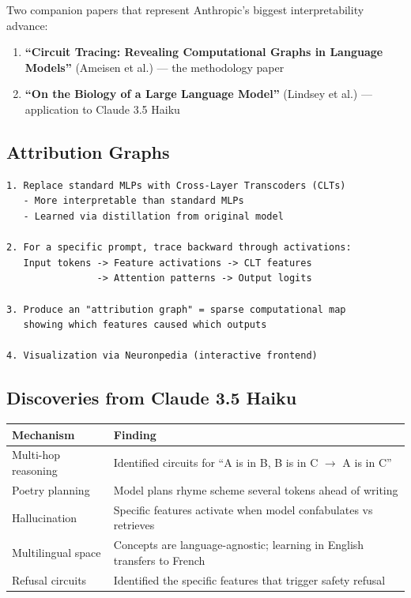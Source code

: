 \documentclass[11pt,a4paper]{article}
\begin{document}
Two companion papers that represent Anthropic's biggest interpretability advance:

\begin{enumerate}[itemsep=1pt]
  \item \textbf{``Circuit Tracing: Revealing Computational Graphs in Language Models''} (Ameisen et al.) --- the methodology paper
  \item \textbf{``On the Biology of a Large Language Model''} (Lindsey et al.) --- application to Claude 3.5 Haiku
\end{enumerate}

\subsection{Attribution Graphs}

\begin{tcolorbox}[colback=green!3, colframe=green!50!black, title={\bfseries How Circuit Tracing Works}]
\begin{lstlisting}[basicstyle=\ttfamily\small, frame=none, backgroundcolor=\color{green!3}]
1. Replace standard MLPs with Cross-Layer Transcoders (CLTs)
   - More interpretable than standard MLPs
   - Learned via distillation from original model

2. For a specific prompt, trace backward through activations:
   Input tokens -> Feature activations -> CLT features
                -> Attention patterns -> Output logits

3. Produce an "attribution graph" = sparse computational map
   showing which features caused which outputs

4. Visualization via Neuronpedia (interactive frontend)
\end{lstlisting}
\end{tcolorbox}

\subsection{Discoveries from Claude 3.5 Haiku}

\begin{center}
\begin{tabular}{lL{9cm}}
\toprule
\textbf{Mechanism} & \textbf{Finding} \\
\midrule
Multi-hop reasoning & Identified circuits for ``A is in B, B is in C $\to$ A is in C'' \\
Poetry planning & Model plans rhyme scheme several tokens ahead of writing \\
Hallucination & Specific features activate when model confabulates vs retrieves \\
Multilingual space & Concepts are language-agnostic; learning in English transfers to French \\
Refusal circuits & Identified the specific features that trigger safety refusal \\
\bottomrule
\end{tabular}
\end{center}
\end{document}
